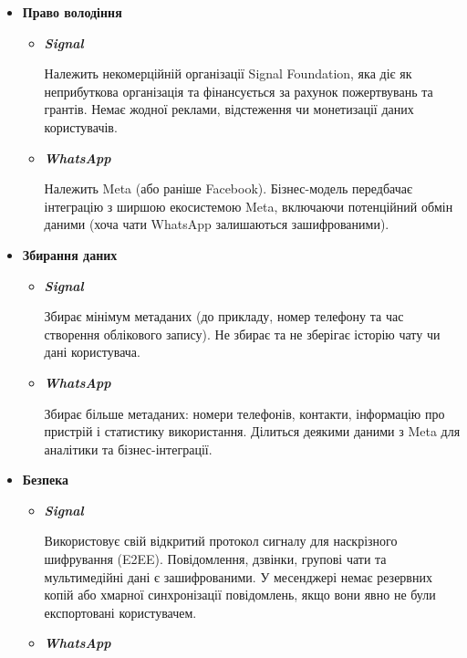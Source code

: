 \begin{itemize}
    \item \textbf{Право володіння}
        \begin{itemize}
            \item \textbf{\textit{Signal}}
                
                Належить некомерційній організації Signal Foundation, яка діє як неприбуткова організація та фінансується за рахунок пожертвувань та грантів. Немає жодної реклами, відстеження чи монетизації даних користувачів.

            \item \textbf{\textit{WhatsApp}}
                
                Належить Meta (або раніше Facebook). Бізнес-модель передбачає інтеграцію з ширшою екосистемою Meta, включаючи потенційний обмін даними (хоча чати WhatsApp залишаються зашифрованими).
        \end{itemize}
    
    \item \textbf{Збирання даних}
        \begin{itemize}
            \item \textbf{\textit{Signal}}
                
                Збирає мінімум метаданих (до прикладу, номер телефону та час створення облікового запису). Не збирає та не зберігає історію чату чи дані користувача.
            \item \textbf{\textit{WhatsApp}}
                
                Збирає більше метаданих: номери телефонів, контакти, інформацію про пристрій і статистику використання. Ділиться деякими даними з Meta для аналітики та бізнес-інтеграції.
        \end{itemize}
        
    \item \textbf{Безпека}
        \begin{itemize}
            \item \textbf{\textit{Signal}}
                
                Використовує свій відкритий протокол сигналу для наскрізного шифрування (E2EE). Повідомлення, дзвінки, групові чати та мультимедійні дані є зашифрованими. У месенджері немає резервних копій або хмарної синхронізації повідомлень, якщо вони явно не були експортовані користувачем.
            \item \textbf{\textit{WhatsApp}}
                

\end{itemize}
\end{itemize}
